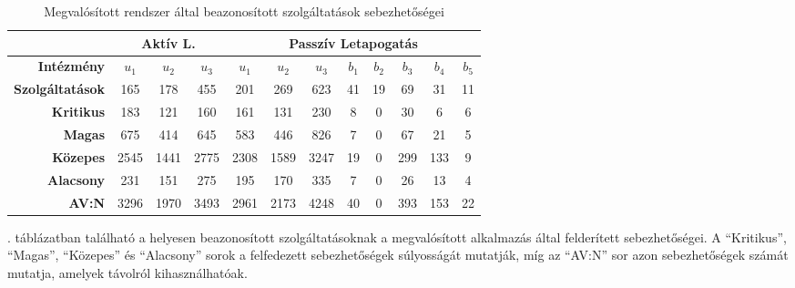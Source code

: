 	\begin{table}[H]
		\centering
		\begin{tabular}{r|ccc|ccc|ccccc|}
			\cline{2-12}
			\multicolumn{1}{l|}{}                         & \multicolumn{3}{c|}{\textbf{Aktív L.}} & \multicolumn{8}{c|}{\textbf{Passzív Letapogatás}}                                                             \\ \hline
			\multicolumn{1}{|r|}{\textbf{Intézmény}}      & \textbf{$u_1$}    & \textbf{$u_2$}    & \textbf{$u_3$}   & \textbf{$u_1$} & \textbf{$u_2$} & \textbf{$u_3$} & \textbf{$b_1$} & \textbf{$b_2$} & \textbf{$b_3$} & \textbf{$b_4$} & \textbf{$b_5$} \\
			\multicolumn{1}{|r|}{\textbf{Szolgáltatások}} & 165            & 178            & 455           & 201         & 269         & 623         & 41          & 19          & 69          & 31          & 11          \\ \hline
			\multicolumn{1}{|r|}{\textbf{Kritikus}}       & 183            & 121            & 160           & 161         & 131         & 230         & 8           & 0           & 30          & 6           & 6           \\
			\multicolumn{1}{|r|}{\textbf{Magas}}          & 675            & 414            & 645           & 583         & 446         & 826         & 7           & 0           & 67          & 21          & 5           \\
			\multicolumn{1}{|r|}{\textbf{Közepes}}        & 2545           & 1441           & 2775          & 2308        & 1589        & 3247        & 19          & 0           & 299         & 133         & 9           \\
			\multicolumn{1}{|r|}{\textbf{Alacsony}}       & 231            & 151            & 275           & 195         & 170         & 335         & 7           & 0           & 26          & 13          & 4           \\
			\multicolumn{1}{|r|}{\textbf{AV:N}}           & 3296           & 1970           & 3493          & 2961        & 2173        & 4248        & 40          & 0           & 393         & 153         & 22          \\ \hline
		\end{tabular}
		\caption{Megvalósított rendszer által beazonosított szolgáltatások sebezhetőségei}
		\label{cpevulns_hu}
	\end{table}
	
	\Az{\ref{cpevulns_hu}}. táblázatban található a helyesen beazonosított szolgáltatásoknak a megvalósított alkalmazás által felderített sebezhetőségei. A ``Kritikus'', ``Magas'', ``Közepes'' és ``Alacsony'' sorok a felfedezett sebezhetőségek súlyosságát mutatják, míg az ``AV:N'' sor azon sebezhetőségek számát mutatja, amelyek távolról kihasználhatóak.
	
